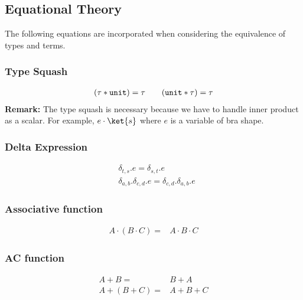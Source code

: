 

\subsection{Equational Theory}
The following equations are incorporated when considering the equivalence of types and terms.

\subsubsection*{Type Squash}
\begin{gather*}
  (\tau * \texttt{unit})  = \tau \qquad (\texttt{unit} * \tau) = \tau \\
\end{gather*}
\textbf{Remark:} The type squash is necessary because we have to handle inner product as a scalar. For example, $e \cdot \ket{s}$ where $e$ is a variable of bra shape.

\subsubsection*{Delta Expression}
\begin{align*}
    & \delta_{t, s}.e = \delta_{s, t}.e \\
    & \delta_{a, b}.\delta_{c, d}.e = \delta_{c, d}.\delta_{a, b}.e
\end{align*}

\subsubsection*{Associative function}
\begin{align*}
    A \cdot (B \cdot C) = & A \cdot B \cdot C
\end{align*}

\subsubsection*{AC function}
\begin{align*}
    A + B = & B + A \\
    A + (B + C) = & A + B + C \\
\end{align*}

